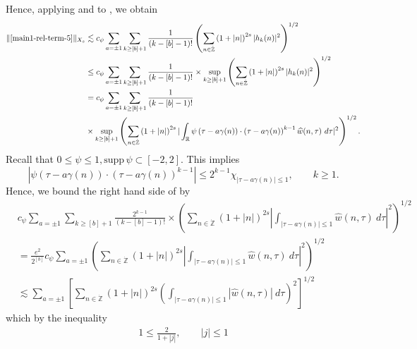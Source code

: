 \documentclass[12pt,reqno]{amsart}
\numberwithin{equation}{section}  %
\renewcommand{\cref}{\Cref}
\newcommand{\rr}{\mathbb{R}}
\newcommand{\zz}{\mathbb{Z}}
\newcommand{\zzdot}{\dot{\zz}}
\newcommand{\wh}{\widehat}
\begin{document}
%
%
Hence, applying \cref{3n} and \cref{4n} to \cref{2n}, we obtain
%
\begin{equation}
	\label{5n}
	\begin{split}
		\|\cref{main1-rel-term-5} \|_{X_{s}}
		& \lesssim c_{\psi} \sum_{a = \pm 1}
    \sum_{k \ge [b] +1} \frac{1}{(k-[b] - 1)!} \left( \sum_{n \in \zzdot} \left (1 + |n| \right )^{2s} | h_k(n) |^2 
		\right)^{1/2}
		\\
    & \le c_{\psi} \sum_{a = \pm 1} \sum_{k \ge [b] +1} \frac{1}{(k-[b] - 1)!}
    \times \sup_{k \ge [b] + 1} \left( \sum_{n \in \zzdot} \left (1 + |n| \right )^{2s} | 
		h_k(n) |^2 \right)^{1/2}
		\\
    & = c_{\psi}  \sum_{a = \pm 1}\sum_{k \ge [b] +1} \frac{1}{(k-[b] - 1)!}
    \\
    & \times \sup_{k \ge [b] + 1} 
		\left( \sum_{n \in \zzdot} \left (1 + |n| \right )^{2s} |\int_\rr 
		\psi\left( \tau - a\gamma(n) \right) \cdot \left( \tau - a\gamma(n) 
    \right)^{k -1} \wh{w}(n, \tau) \ d \tau|^{2} \right)^{1/2}.
    \end{split}
\end{equation}
%
Recall that $0 \le \psi \le 1, \text{supp} \, \psi \subset [-2,2 ]$. 
This implies $$| \psi\left( \tau - a\gamma(n) \right) \cdot \left( \tau - a\gamma(n)
\right)^{k -1} | \le 2^{k-1} \chi_{| \tau - a\gamma(n) | \le 1}, \qquad k \ge 1.$$ Hence,
we bound the right hand side of \cref{5n} by
%
\begin{equation*}
	\begin{split}
    & c_{\psi} \sum_{a = \pm 1}
    \sum_{k \ge [b] +1} \frac{2^{k-1}}{(k-[b] - 1)!}
    \times \left( \sum_{n \in \zzdot} (1 + | n |)^{2s}| 
		\int_{| \tau - a\gamma(n)  |\le 1}  \wh{w}(n, \tau) \ d \tau |^2 
		\right)^{1/2}
    \\
    & = \frac{e^{2}}{2^{[b]}} c_{\psi} \sum_{a = \pm 1} \left( \sum_{n \in \zzdot} (1 + | n |)^{2s}| 
		\int_{| \tau - a\gamma(n)  |\le 1}  \wh{w}(n, \tau) \ d \tau |^2 
		\right)^{1/2}
    \\
    & \lesssim \sum_{a = \pm 1}
\left[ \sum_{n \in \zzdot} (1 + | n |)^{2s}\left (  
		\int_{| \tau - a\gamma(n)  |\le 1} | \wh{w}(n, \tau) | \ d \tau \right ) ^2 
		\right]^{1/2}
	\end{split}
\end{equation*}
%
which by the inequality
%
\begin{equation*}
	\begin{split}
		1 \le 
		\frac{2}{1 + | j |}, \qquad | j | \le 1
	\end{split}
\end{equation*}
\end{document}
